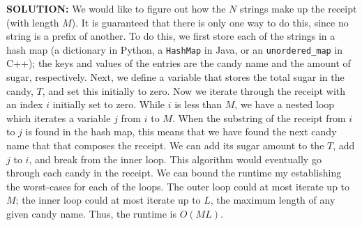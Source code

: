\textbf{SOLUTION:}
\blank
We would like to figure out how the $N$ strings make up the receipt (with length $M$). It is guaranteed that there is only one way to do this, since no string is a prefix of another.
\blank
To do this, we first store each of the strings in a hash map (a dictionary in Python, a \verb|HashMap| in Java, or an \verb|unordered_map| in C++); the keys and values of the entries are the candy name and the amount of sugar, respectively.
\blank
Next, we define a variable that stores the total sugar in the candy, $T$, and set this initially to zero. Now we iterate through the receipt with an index $i$ initially set to zero. While $i$ is less than $M$, we have a nested loop which iterates a variable $j$ from $i$ to $M$. When the substring of the receipt from $i$ to $j$ is found in the hash map, this means that we have found the next candy name that that composes the receipt. We can add its sugar amount to the $T$, add $j$ to $i$, and break from the inner loop. This algorithm would eventually go through each candy in the receipt.
\blank
We can bound the runtime my establishing the worst-cases for each of the loops. The outer loop could at most iterate up to $M$; the inner loop could at most iterate up to $L$, the maximum length of any given candy name. Thus, the runtime is $O(ML)$.